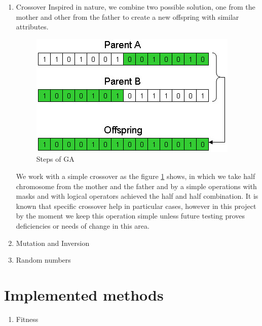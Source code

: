 \documentclass[twocolumn]{IEEEtran}
\begin{document}
\begin{enumerate}
        
    \item Crossover
    	Inspired in nature, we combine two possible solution, one from the mother and other from the 
        father to create a new offspring with similar attributes.
	    \begin{figure}[h!]
        \centering
        \includegraphics[width=\columnwidth]{src/crossover.jpg}
		\caption{Steps of GA}
        \label{fig:crossover}
		\end{figure}
        We work with a simple crossover as the figure \ref{fig:crossover} shows, in which we take half 
        chromosome from the mother and the father and by a simple operations with masks and with 
        logical operators achieved the half and half combination. It is known that specific crossover
        help in particular cases, however in this project by the moment we keep this operation simple
        unless future testing proves deficiencies or needs of change in this area. 
        
        
    \item Mutation and Inversion
    \item  Random numbers
    
\end{enumerate}


\section{Implemented methods} \label{sec:Implemented_methods}
	\begin{enumerate}

	\item Fitness 
    
\end{enumerate}
    
\end{document}
